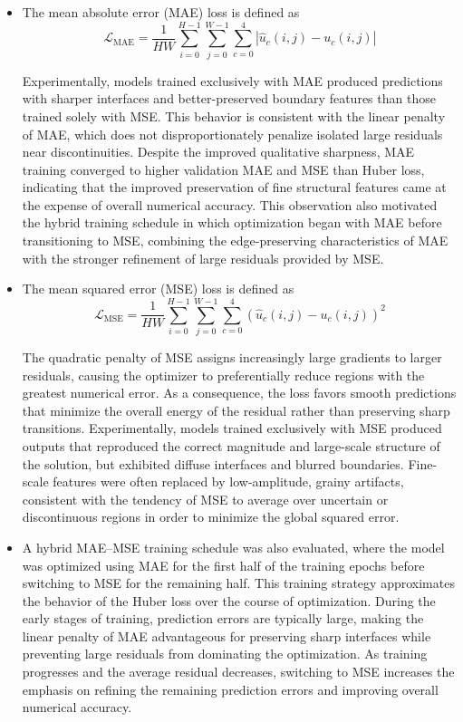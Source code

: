 \documentclass[preprint,review,12pt]{elsarticle}
\begin{document}
\begin{itemize}
    \item The mean absolute error (MAE) loss is defined as
\begin{equation*}
    \mathcal{L}_{\text{MAE}} = \frac{1}{HW} \sum_{i=0}^{H-1} \sum_{j=0}^{W-1} \sum_{c=0}^{4} \left| \hat{u}_{c}(i,j) - u_{c}(i,j) \right|
\end{equation*}

Experimentally, models trained exclusively with MAE produced predictions with sharper interfaces and better-preserved boundary features than those trained solely with MSE. This behavior is consistent with the linear penalty of MAE, which does not disproportionately penalize isolated large residuals near discontinuities. Despite the improved qualitative sharpness, MAE training converged to higher validation MAE and MSE than Huber loss, indicating that the improved preservation of fine structural features came at the expense of overall numerical accuracy. This observation also motivated the hybrid training schedule in which optimization began with MAE before transitioning to MSE, combining the edge-preserving characteristics of MAE with the stronger refinement of large residuals provided by MSE.

\item The mean squared error (MSE) loss is defined as
\begin{equation*}
    \mathcal{L}_{\text{MSE}} = \frac{1}{HW} \sum_{i=0}^{H-1} \sum_{j=0}^{W-1} \sum_{c=0}^{4} \left( \hat{u}_{c}(i,j) - u_{c}(i,j) \right)^2
\end{equation*}

The quadratic penalty of MSE assigns increasingly large gradients to larger residuals, causing the optimizer to preferentially reduce regions with the greatest numerical error. As a consequence, the loss favors smooth predictions that minimize the overall energy of the residual rather than preserving sharp transitions. Experimentally, models trained exclusively with MSE produced outputs that reproduced the correct magnitude and large-scale structure of the solution, but exhibited diffuse interfaces and blurred boundaries. Fine-scale features were often replaced by low-amplitude, grainy artifacts, consistent with the tendency of MSE to average over uncertain or discontinuous regions in order to minimize the global squared error.

\item A hybrid MAE--MSE training schedule was also evaluated, where the model was optimized using MAE for the first half of the training epochs before switching to MSE for the remaining half. This training strategy approximates the behavior of the Huber loss over the course of optimization. During the early stages of training, prediction errors are typically large, making the linear penalty of MAE advantageous for preserving sharp interfaces while preventing large residuals from dominating the optimization. As training progresses and the average residual decreases, switching to MSE increases the emphasis on refining the remaining prediction errors and improving overall numerical accuracy.


\end{itemize}
\end{document}
